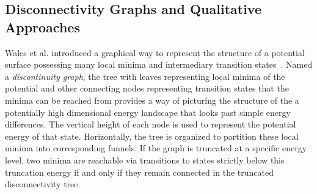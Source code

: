 

\subsection{Disconnectivity Graphs and Qualitative Approaches}

Wales et al. introduced a graphical way to represent the structure of a potential surface possessing many local minima and intermediary transition states~\cite{Wales1998, Doye1999}. Named a \textit{discontinuity graph}, the tree with leaves representing local minima of the potential and other connecting nodes representing transition states that the minima can be reached from provides a way of picturing the structure of the a potentially high dimensional energy landscape that looks past simple energy differences. The vertical height of each node is used to represent the potential energy of that state. Horizontally, the tree is organized to partition these local minima into corresponding funnels. If the graph is truncated at a specific energy level, two minima are reachable via transitions to states strictly below this truncation energy if and only if they remain connected in the truncated disconnectivity tree. 



